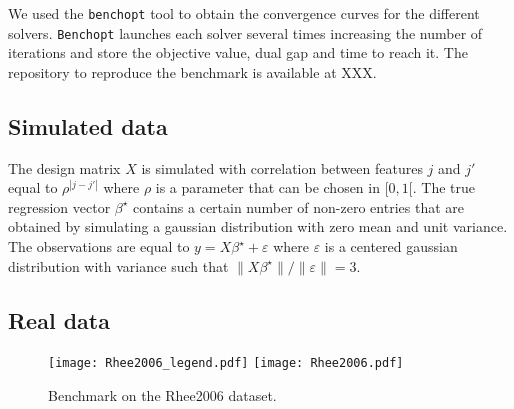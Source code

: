 We used the \texttt{benchopt} \cite{moreau2022benchopt} tool to obtain the convergence curves for the different solvers.
\texttt{Benchopt} launches each solver several times increasing the number of iterations and store the objective value, dual gap and time to reach it.
The repository to reproduce the benchmark is available at XXX.

\subsection{Simulated data}

The design matrix $X$ is simulated with correlation between features $j$ and $j'$ equal to $\rho^{|j-j'|}$ where $\rho$ is a parameter that can be chosen in $[0, 1[$. 
The true regression vector $\beta^\star$ contains a certain number of non-zero entries that are obtained by simulating a gaussian distribution with zero mean and unit variance.
The observations are equal to $y=X\beta^\star + \varepsilon$ where $\varepsilon$ is a centered gaussian distribution with variance such that $\lVert X\beta^\star\rVert / \lVert \varepsilon \rVert = 3$.

\subsection{Real data}
\begin{figure*}[htbp]
  \centering
  \texttt{[image: Rhee2006\_legend.pdf]}
  \texttt{[image: Rhee2006.pdf]}
  \caption{Benchmark on the Rhee2006 dataset.}
  \label{fig:Rhee2006}
\end{figure*}
